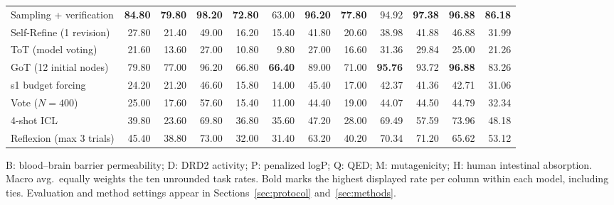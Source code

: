 \begin{table}[t]
\begin{tabular*}{\linewidth}{@{\extracolsep{\fill}}l *{11}{r}@{}}
Sampling + verification & \textbf{84.80} & \textbf{79.80} & \textbf{98.20} & \textbf{72.80} & 63.00 & \textbf{96.20} & \textbf{77.80} & 94.92 & \textbf{97.38} & \textbf{96.88} & \textbf{86.18} \\
Self-Refine (1 revision) & 27.80 & 21.40 & 49.00 & 16.20 & 15.40 & 41.80 & 20.60 & 38.98 & 41.88 & 46.88 & 31.99 \\
ToT (model voting) & 21.60 & 13.60 & 27.00 & 10.80 & 9.80 & 27.00 & 16.60 & 31.36 & 29.84 & 25.00 & 21.26 \\
GoT (12 initial nodes) & 79.80 & 77.00 & 96.20 & 66.80 & \textbf{66.40} & 89.00 & 71.00 & \textbf{95.76} & 93.72 & \textbf{96.88} & 83.26 \\
s1 budget forcing & 24.20 & 21.20 & 46.60 & 15.80 & 14.00 & 45.40 & 17.00 & 42.37 & 41.36 & 42.71 & 31.06 \\
Vote ($N=400$) & 25.00 & 17.60 & 57.60 & 15.40 & 11.00 & 44.40 & 19.00 & 44.07 & 44.50 & 44.79 & 32.34 \\
4-shot ICL & 39.80 & 23.60 & 69.80 & 36.80 & 35.60 & 47.20 & 28.00 & 69.49 & 57.59 & 73.96 & 48.18 \\
Reflexion (max 3 trials) & 45.40 & 38.80 & 73.00 & 32.00 & 31.40 & 63.20 & 40.20 & 70.34 & 71.20 & 65.62 & 53.12 \\
\bottomrule\end{tabular*}
\par\vspace{4pt}\noindent\begin{minipage}{\linewidth}\TableNoteFont
B: blood--brain barrier permeability; D: DRD2 activity; P: penalized logP; Q: QED; M: mutagenicity; H: human intestinal absorption. Macro avg.\ equally weights the ten unrounded task rates. Bold marks the highest displayed rate per column within each model, including ties. Evaluation and method settings appear in Sections~\ref{sec:protocol} and~\ref{sec:methods}.
\end{minipage}
\end{table}
